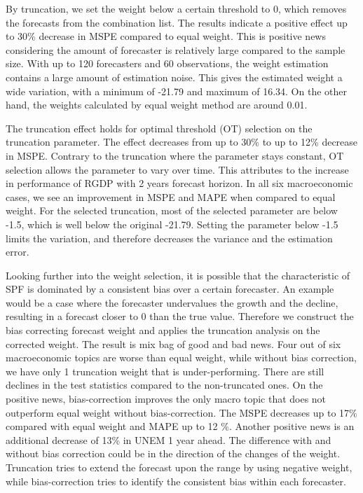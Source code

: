 \documentclass[11pt]{article}
\begin{document}
By truncation, we set the weight below a certain threshold to 0, which removes the forecasts from the combination list. The results indicate a positive effect up to 30\% decrease in MSPE compared to equal weight. 
This is positive news considering the amount of forecaster is relatively large compared to the sample size. 
With up to 120 forecasters and 60 observations, the weight estimation contains a large amount of estimation noise.
This gives the estimated weight a wide variation, with a minimum of -21.79 and maximum of 16.34. On the other hand, the weights calculated by equal weight method are around 0.01.

The truncation effect holds for optimal threshold (OT) selection on the truncation parameter. The effect decreases from up to 30\% to up to 12\% decrease in MSPE. Contrary to the truncation where the parameter stays constant, OT selection allows the parameter to vary over time. This attributes to the increase in performance of RGDP with 2 years forecast horizon. In all six macroeconomic cases, we see an improvement in MSPE and MAPE when compared to equal weight. For the selected truncation, most of the selected parameter are below -1.5, which is well below the original -21.79. Setting the parameter below -1.5 limits the variation, and therefore decreases the variance and the estimation error.

Looking further into the weight selection, it is possible that the characteristic of SPF is dominated by a consistent bias over a certain forecaster. An example would be a case where the forecaster undervalues the growth and the decline, resulting in a forecast closer to 0 than the true value. Therefore we construct the bias correcting forecast weight and applies the truncation analysis on the corrected weight. The result is mix bag of good and bad news. Four out of six macroeconomic topics are worse than equal weight, while without bias correction, we have only 1 truncation weight that is under-performing. There are still declines in the test statistics compared to the non-truncated ones. On the positive news, bias-correction improves the only macro topic that does not outperform equal weight without bias-correction. The MSPE decreases up to 17\% compared with equal weight and MAPE up to 12 \%. Another positive news is an additional decrease of 13\% in UNEM 1 year ahead. The difference with and without bias correction could be in the direction of the changes of the weight. Truncation tries to extend the forecast upon the range by using negative weight, while bias-correction tries to identify the consistent bias within each forecaster.
\end{document}
